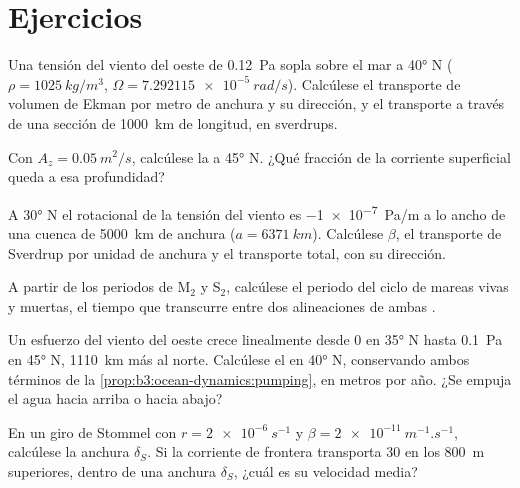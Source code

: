 \section{Ejercicios}

\begin{exercise}[$\star$]\label{exo:b3:ocean-dynamics:1}
Una tensión del viento del oeste de \qty{0.12}{Pa} sopla sobre el mar a \ang{40} N
($\rho = \qty{1025}{kg/m^3}$, $\Omega = \qty{7.292115e-5}{rad/s}$).
Calcúlese el transporte de volumen de Ekman por metro de anchura y su dirección,
y el transporte a través de una sección de \qty{1000}{km} de longitud, en sverdrups.
\end{exercise}

\begin{exercise}[$\star$]\label{exo:b3:ocean-dynamics:2}
Con $A_z = \qty{0.05}{m^2/s}$, calcúlese la  a \ang{45} N. ¿Qué
fracción de la corriente superficial queda a esa profundidad?
\end{exercise}

\begin{exercise}[$\star$]\label{exo:b3:ocean-dynamics:3}
A \ang{30} N el rotacional de la tensión del viento es \qty{-1e-7}{Pa/m} a lo ancho de una
cuenca de \qty{5000}{km} de anchura ($a = \qty{6371}{km}$). Calcúlese $\beta$, el
transporte de Sverdrup por unidad de anchura y el transporte total, con su
dirección.
\end{exercise}

\begin{exercise}[$\star$]\label{exo:b3:ocean-dynamics:4}
A partir de los periodos de M$_2$ y S$_2$, calcúlese el periodo del ciclo de
mareas vivas y muertas, el tiempo que transcurre entre dos alineaciones de
ambas .
\end{exercise}

\begin{exercise}[$\star\star$]\label{exo:b3:ocean-dynamics:5}
Un esfuerzo del viento del oeste crece linealmente desde 0 en \ang{35} N hasta \qty{0.1}{Pa} en
\ang{45} N, \qty{1110}{km} más al norte. Calcúlese el  en
\ang{40} N, conservando ambos términos de la \cref{prop:b3:ocean-dynamics:pumping}, en
metros por año. ¿Se empuja el agua hacia arriba o hacia abajo?
\end{exercise}

\begin{exercise}[$\star\star$]\label{exo:b3:ocean-dynamics:6}
En un giro de Stommel con $r = \qty{2e-6}{s^{-1}}$ y $\beta =
\qty{2e-11}{m^{-1}.s^{-1}}$, calcúlese la anchura $\delta_S$. Si la corriente de
frontera transporta \qty{30}{\sverdrup} en los \qty{800}{m} superiores, dentro de una
anchura $\delta_S$, ¿cuál es su velocidad media?
\end{exercise}

